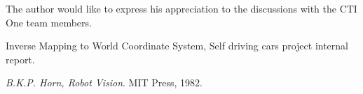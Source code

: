 \documentclass[conference]{IEEEtran}
\begin{document}
The author would like to express his appreciation to  
the discussions with the CTI One team members. 



%
%
%
\begin{thebibliography}{1}


Inverse Mapping to World Coordinate System, Self driving cars project internal report. 

\textit{B.K.P. Horn, Robot Vision}.  
MIT Press, 1982. 

\end{thebibliography}




\end{document}
